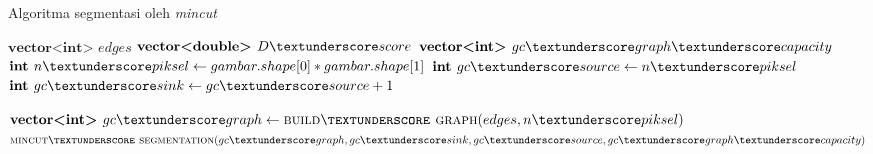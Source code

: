 \begin{algorithm}
    \caption{Algoritma segmentasi oleh \emph{mincut}}          
    \label{algo:mincut_algorithm}                 
    \begin{algorithmic}            %
        \State $\textbf{vector<int> } edges$
        \State $\textbf{vector<double> } D\textunderscore score$
        \State $\textbf{vector<int> } gc\textunderscore graph\textunderscore capacity$
        \State $\textbf{int } n\textunderscore piksel \gets gambar.shape[0] * gambar.shape[1]$
        \State $\textbf{int } gc\textunderscore source \gets n\textunderscore piksel$
        \State $\textbf{int } gc\textunderscore sink \gets gc\textunderscore source + 1$

            \State $\textbf{vector<int> } gc\textunderscore graph \gets \Call{build\textunderscore graph}{edges, n\textunderscore piksel}$
            \State $\Call{mincut\textunderscore segmentation}{gc\textunderscore graph, gc\textunderscore sink, gc\textunderscore source, gc\textunderscore graph\textunderscore capacity}$
        \EndFunction
    \end{algorithmic}
\end{algorithm}

